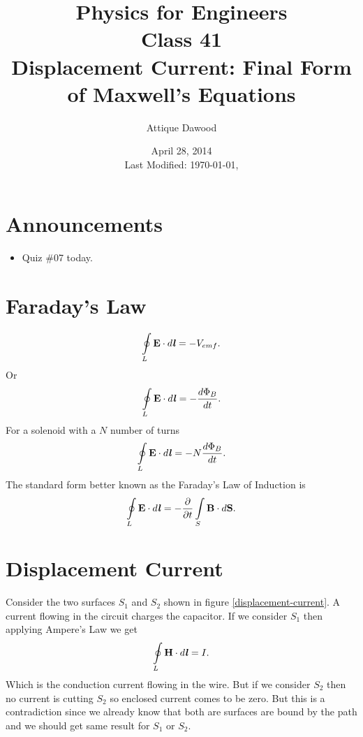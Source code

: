 \documentclass[12pt,a4paper]{article}
\title{\vspace{-3cm}Physics for Engineers\\Class 41\\Displacement Current: Final Form of Maxwell's Equations}
\author{Attique Dawood}
\date{April 28, 2014\\[0.2cm] Last Modified: \today, \currenttime}
\begin{document}
\maketitle
\section{Announcements}
\begin{itemize}
\item Quiz \#07 today.
\end{itemize}
\section{Faraday's Law}
\begin{equation}
\oint\limits_{L} \textbf{E}\cdot d\textbf{\textit{l}}=-V_{emf}.
\end{equation}
Or
\begin{equation}
\oint\limits_{L} \textbf{E}\cdot d\textbf{\textit{l}}=-\dfrac{d\Phi_B}{dt}.
\end{equation}
For a solenoid with a $N$ number of turns
\begin{equation}
\oint\limits_{L} \textbf{E}\cdot d\textbf{\textit{l}}=-N\dfrac{d\Phi_B}{dt}.
\end{equation}
The standard form better known as the Faraday's Law of Induction is
\begin{equation}
\oint\limits_{L} \textbf{E}\cdot d\textbf{\textit{l}}=-\dfrac{\partial}{\partial t}\int\limits_{S}\textbf{B}\cdot d\textbf{S}.
\end{equation}
\section{Displacement Current}
Consider the two surfaces $S_1$ and $S_2$ shown in figure \ref{displacement-current}. A current flowing in the circuit charges the capacitor. If we consider $S_1$ then applying Ampere's Law we get
\begin{equation}
\oint\limits_{L} \textbf{H}\cdot d\textbf{\textit{l}}=I.
\end{equation}
Which is the conduction current flowing in the wire. But if we consider $S_2$ then no current is cutting $S_2$ so enclosed current comes to be zero. But this is a contradiction since we already know that both are surfaces are bound by the path and we should get same result for $S_1$ or $S_2$.
\end{document}
